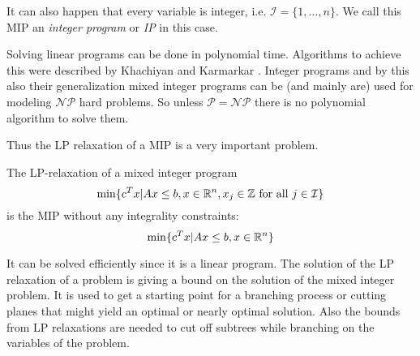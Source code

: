 It can also happen that every variable is integer, i.e. $\mathcal{I}=\{1,\dots, n\}$. We call this MIP an 
\textit{integer program} or \textit{IP} in this case.

Solving linear programs can be done in polynomial time. Algorithms to achieve this were described by 
Khachiyan\cite{KHACHIYAN198053} and Karmarkar \cite{Karmarkar:1984:NPA:800057.808695}. Integer programs and by this 
also their generalization mixed integer programs can be (and mainly are) used for modeling $\mathcal{NP}$ hard 
problems. So unless $\mathcal{P}=\mathcal{NP}$ there is no polynomial algorithm to solve them.

Thus the LP relaxation of a MIP is a very important problem.
\begin{definition}
 The LP-relaxation of a mixed integer program 
 $$\min\{c^T x|Ax\le b, x\in\mathbb{R}^n, x_j\in\mathbb{Z}\textrm{ for all }j\in\mathcal{I} \}$$
 is the MIP without any integrality constraints:
 $$\min\{c^T x|Ax\le b, x\in\mathbb{R}^n \}$$
\end{definition}

It can be solved efficiently since it is a linear program. The solution of the LP relaxation of a problem is  giving a 
bound on the solution of the mixed integer problem. It is used to get a starting 
point for a branching process or cutting planes that might yield an optimal or nearly optimal solution. Also the bounds 
from LP relaxations are needed to cut off subtrees while branching on the variables of the problem.